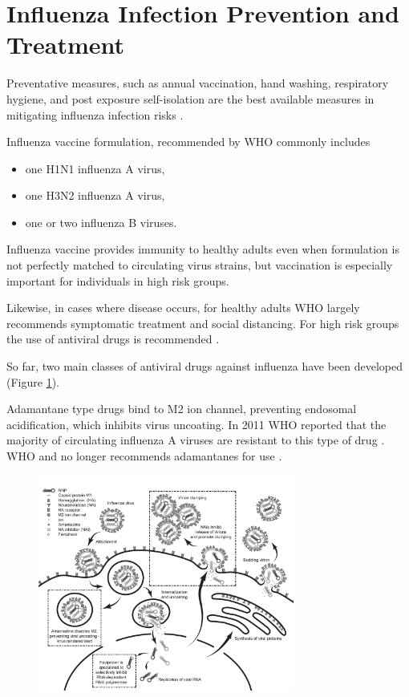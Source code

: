 \section{Influenza Infection Prevention and Treatment}

Preventative measures, such as annual vaccination, hand washing, respiratory hygiene, and post exposure self-isolation are the best available measures in mitigating influenza infection risks \cite{influenza_seasonal_2018}.

Influenza vaccine formulation, recommended by WHO commonly includes \cite{RecommendedCompositionVaccines}

\begin{itemize}
    \item one H1N1 influenza A virus,
    \item one H3N2 influenza A virus,
    \item one or two influenza B viruses.
\end{itemize}

Influenza vaccine provides immunity to healthy adults even when formulation is not perfectly matched to circulating virus strains, but vaccination is especially important for individuals in high risk groups.

Likewise, in cases where disease occurs, for healthy adults WHO largely recommends symptomatic treatment and social distancing. For high risk groups the use of antiviral drugs is recommended \cite{influenza_seasonal_2018}.

So far, two main classes of antiviral drugs against influenza have been developed (Figure \ref{figure:fluDrugs}).

Adamantane type drugs bind to M2 ion channel, preventing endosomal acidification, which inhibits virus uncoating. In 2011 WHO reported that the majority of circulating influenza A viruses are resistant to this type of drug \cite{whoAntivirals2011}. WHO and no longer recommends adamantanes for use \cite{influenza_seasonal_2018}.

\begin{figure}
\begin{center}
\includegraphics[width=0.75\textwidth, trim={0cm 0cm 0cm 0cm}, clip]{D_chapters/0_introduction/flu_drug.pdf}
\label{figure:fluDrugs}
\end{center}
\end{figure}

